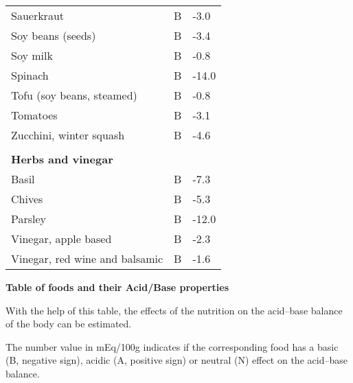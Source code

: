 \documentclass[../main.tex]{subfiles}
\begin{document}
\begin{longtable}{p{7cm}p{0.5cm}p{1cm}}
Sauerkraut  & B  & -3.0 \\
Soy beans (seeds)  & B  & -3.4 \\
Soy milk  & B  & -0.8 \\
Spinach  & B  & -14.0 \\
Tofu (soy beans, steamed)  & B  & -0.8 \\
Tomatoes  & B  & -3.1 \\
Zucchini, winter squash  & B  & -4.6 \\
 \\
\multicolumn{3}{l}{\textbf{Herbs and vinegar}}  \\
Basil  & B  & -7.3 \\
Chives  & B  & -5.3 \\
Parsley  & B  & -12.0 \\
Vinegar, apple based  & B  & -2.3 \\
Vinegar, red wine and balsamic  & B  & -1.6 \\
   \bottomrule
  \end{longtable}

\raggedright

\textbf{Table of foods and their Acid/Base properties}

With the help of this table, the effects of the nutrition on the acid--base balance of the body can be estimated.

The number value in mEq/100g indicates if the corresponding food has a basic (B, negative sign),
acidic (A, positive sign) or neutral (N) effect on the acid--base balance.
\end{document}
